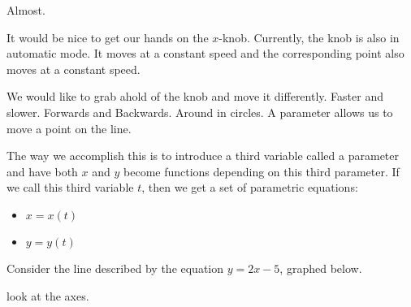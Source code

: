 \documentclass{ximera}
\begin{document}
Almost.

It would be nice to get our hands on the $x$-knob.  Currently, the knob is also in automatic mode.  It moves at a constant speed and the corresponding point also moves at a constant speed.

We would like to grab ahold of the knob and move it differently.  Faster and slower.  Forwards and Backwards. Around in circles.  A parameter allows us to move a point on the line.

The way we accomplish this is to introduce a third variable called a parameter and have both $x$ and $y$ become functions depending on this third parameter. If we call this third variable $t$, then we get a set of parametric equations:



\begin{itemize}
\item $x = x(t)$
\item $y = y(t)$
\end{itemize}


Consider the line described by the equation $y = 2x - 5$, graphed below.






\begin{image}
\end{image}





look at the axes.
\end{document}
